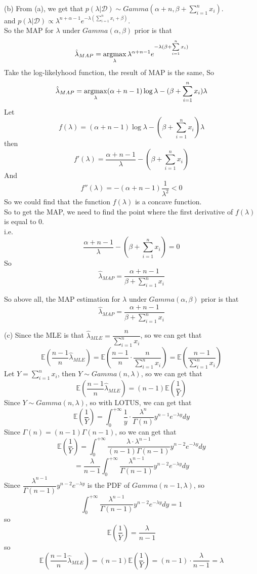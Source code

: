 \documentclass[10pt]{article}
\begin{document}
\begin{enumerate}[1.]
		  (b) From (a), we get that $p(\lambda|\mathcal{D})\sim Gamma(\alpha+n,\beta+\sum\limits_{i=1}^nx_i)$.\\
		  and $p(\lambda|\mathcal{D})\propto\lambda^{n+\alpha-1}e^{-\lambda(\sum\limits_{i=1}^nx_i+\beta)}$.\\
		  So the MAP for $\lambda$ under $Gamma(\alpha,\beta)$ prior is that
		  $$\hat{\lambda}_{MAP}=\mathop{\rm argmax}\limits_{\lambda}\lambda^{\alpha+n-1}e^{-\lambda(\beta+\sum\limits_{i=1}^nx_i)}$$
		  Take the log-likelyhood function, the result of MAP is the same, So
		  $$\hat{\lambda}_{MAP}=\mathop{\rm argmax}\limits_{\lambda}(\alpha+n-1)\log\lambda-(\beta+\sum\limits_{i=1}^nx_i)\lambda$$
		  Let $$f(\lambda)=(\alpha+n-1)\log\lambda-(\beta+\sum\limits_{i=1}^nx_i)\lambda$$
		  then $$f'(\lambda)=\dfrac{\alpha+n-1}{\lambda}-(\beta+\sum\limits_{i=1}^nx_i)$$
		  And $$f''(\lambda)=-(\alpha+n-1)\dfrac{1}{\lambda^2}<0$$
		  So we could find that the function $f(\lambda)$ is a concave function.\\
		  So to get the MAP, we need to find the point where the first derivative of $f(\lambda)$ is equal to 0.\\
		  i.e. $$\dfrac{\alpha+n-1}{\lambda}-(\beta+\sum\limits_{i=1}^nx_i)=0$$
		  So $$\hat{\lambda}_{MAP}=\dfrac{\alpha+n-1}{\beta+\sum\limits_{i=1}^nx_i}$$

		  So above all, the MAP estimation for $\lambda$ under $Gamma(\alpha,\beta)$ prior is that
		  $$\hat{\lambda}_{MAP}=\dfrac{\alpha+n-1}{\beta+\sum\limits_{i=1}^nx_i}$$

		  (c) Since the MLE is that $\hat{\lambda}_{MLE}=\dfrac{n}{\sum\limits_{i=1}^nx_i}$, so we can get that
		  $$\mathbb{E}(\dfrac{n-1}{n}\hat{\lambda}_{MLE})=\mathbb{E}(\dfrac{n-1}{n}\cdot\dfrac{n}{\sum\limits_{i=1}^nx_i})=\mathbb{E}(\dfrac{n-1}{\sum\limits_{i=1}^nx_i})$$
		  Let $Y=\sum\limits_{i=1}^nx_i$, then $Y\sim Gamma(n,\lambda)$, so we can get that
		  $$\mathbb{E}(\dfrac{n-1}{n}\hat{\lambda}_{MLE})=(n-1)\mathbb{E}(\dfrac{1}{Y})$$
		  Since $Y\sim Gamma(n,\lambda)$, so with LOTUS, we can get that
		  $$\mathbb{E}(\dfrac{1}{Y})=\int_{0}^{+\infty}\dfrac{1}{y}\cdot\dfrac{\lambda^n}{\Gamma(n)}y^{n-1}e^{-\lambda y}dy$$
		  Since $\Gamma(n)=(n-1)\Gamma(n-1)$, so we can get that
		  $$\mathbb{E}(\dfrac{1}{Y})=\int_{0}^{+\infty}\dfrac{\lambda\cdot\lambda^{n-1}}{(n-1)\Gamma(n-1)}y^{n-2}e^{-\lambda y}dy$$
		  $$=\dfrac{\lambda}{n-1}\int_{0}^{+\infty}\dfrac{\lambda^{n-1}}{\Gamma(n-1)}y^{n-2}e^{-\lambda y}dy$$
      	  Since $\dfrac{\lambda^{n-1}}{\Gamma(n-1)}y^{n-2}e^{-\lambda y}$ is the PDF of $Gamma(n-1,\lambda)$,
		  so $$\int_{0}^{+\infty}\dfrac{\lambda^{n-1}}{\Gamma(n-1)}y^{n-2}e^{-\lambda y}dy=1$$
		  so $$\mathbb{E}(\dfrac{1}{Y})=\dfrac{\lambda}{n-1}$$
		  so $$\mathbb{E}(\dfrac{n-1}{n}\hat{\lambda}_{MLE})=(n-1)\mathbb{E}(\dfrac{1}{Y})=(n-1)\cdot\dfrac{\lambda}{n-1}=\lambda$$


\end{enumerate}
\end{document}
